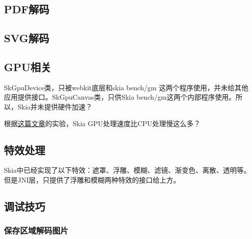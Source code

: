 \subsection{PDF解码}
\label{sec:skia-pdf}

\subsection{SVG解码}
\label{sec:skia-svg}

\subsection{GPU相关}
\label{sec:skia-gpu}
SkGpuDevice类，只被webkit底层和skia bench/gm 这两个程序使用，并未给其他应用提供接口。SkGpuCanvas类，只供Skia bench/gm这两个内部程序使用。所以，Skia并未提供硬件加速？

根据\href{http://dev.dorothybrowser.com/?p=41}{这篇文章}的实验，Skia GPU处理速度比CPU处理慢这么多？
\subsection{特效处理}
\label{sec:skia-effect}
Skia中已经实现了以下特效：遮罩、浮雕、模糊、滤镜、渐变色、离散、透明等。但是JNI层，只提供了浮雕和模糊两种特效的接口给上方。

\subsection{调试技巧}
\label{sec:skia-debug}

\subsubsection{保存区域解码图片}
\label{sec:skia-debug-save-image}

